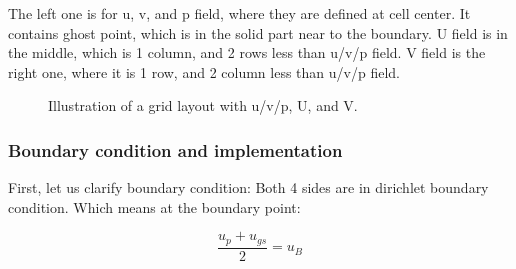 \documentclass[12pt]{article}
\begin{document}
The left one is for u, v, and p field, where they are defined at cell center. It contains ghost point, which is in the solid part near to the boundary. U field is in the middle, which is 1 column, and 2 rows less than u/v/p field. V field is the right one, where it is 1 row, and 2 column less than u/v/p field.


\begin{figure}[H]
\centering
{}
\caption{Illustration of a grid layout with u/v/p, U, and V.}
\end{figure}


\subsubsection{Boundary condition and implementation}
First, let us clarify boundary condition:
Both 4 sides are in dirichlet boundary condition.
Which means at the boundary point:

$$
\frac{u_{p} + u_{gs}}{2} = u_{B}
$$
\end{document}
